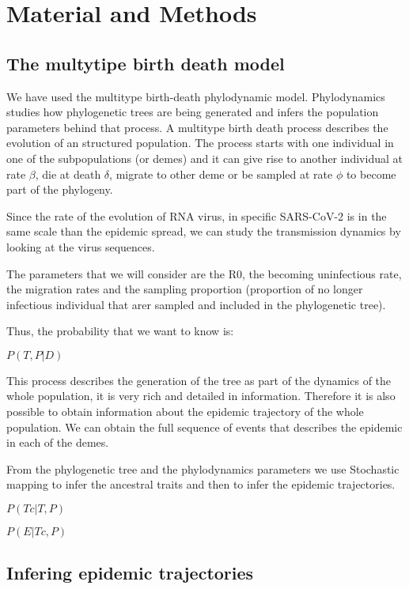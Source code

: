 \chapter{Material and Methods}

\section{The multytipe birth death model}

We have used the multitype birth-death phylodynamic model. Phylodynamics studies how phylogenetic trees are being generated and infers the population parameters behind that process. A multitype birth death process describes the evolution of an structured population. The process starts with one individual in one of the subpopulations (or demes) and it can give rise to another individual at rate $\beta$, die at death $\delta$, migrate to other deme or be sampled at rate $\phi$ to become part of the phylogeny.

Since the rate of the evolution of RNA virus, in specific SARS-CoV-2 is in the same scale than the epidemic spread, we can study the transmission dynamics by looking at the virus sequences. 

The parameters that we will consider are the R0, the becoming uninfectious rate, the migration rates and the sampling proportion (proportion of no longer infectious individual that arer sampled and included in the phylogenetic tree).

Thus, the probability that we want to know is:

$P(T, P | D)$


This process describes the generation of the tree as part of the dynamics of the whole population, it is very rich and detailed in information. Therefore it is also possible to obtain information about the epidemic trajectory of the whole population. We can obtain the full sequence of events that describes the epidemic in each of the demes.

From the phylogenetic tree and the phylodynamics parameters we use Stochastic mapping to infer the ancestral traits and then to infer the epidemic trajectories.

$P(Tc | T, P)$

$P(E | Tc, P)$


\section{Infering epidemic trajectories}

